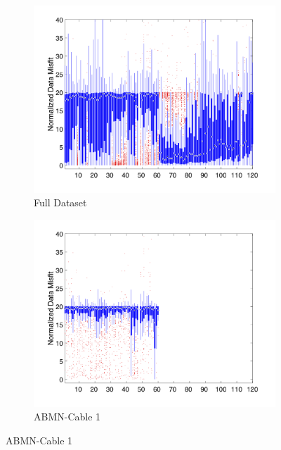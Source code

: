 \documentclass[final,authoryear,5p,times,twocolumn]{elsarticle}
\begin{document}
\begin{figure}[!ht]
   \centering

   \begin{subfigure}[b]{0.475\linewidth}
       \centering
       \includegraphics[trim=1.6cm 1.7cm 2cm 1.3cm, clip=true, width=\linewidth]{./Figures/Fig8a.png}
       \caption{Full Dataset}
       \label{fig:Boxplot_Full_DataMisfit_vs_MElecID}
   \end{subfigure}
   \hfill
   \begin{subfigure}[b]{0.475\linewidth}
       \centering
       \includegraphics[trim=1.6cm 1.7cm 2cm 1.3cm, clip=true, width=\linewidth]{./Figures/Fig8b.png}
       \caption{ABMN-Cable 1}
       \label{fig:Boxplot_ABMN_Cable1_Misfit_vs_M_ElecID}
   \end{subfigure}


\end{figure}
\end{document}
